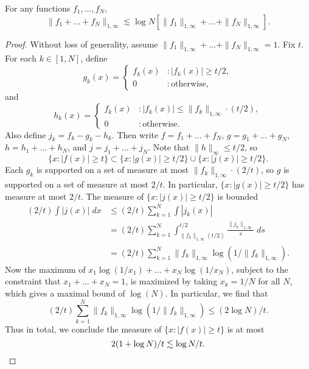 \begin{theorem}
    For any functions $f_1,\dots, f_N$,
    \[ \| f_1 + \dots + f_N \|_{1,\infty} \lesssim \log N \left[ \| f_1 \|_{1,\infty} + \dots + \| f_N \|_{1,\infty} \right]. \]
\end{theorem}
\begin{proof}
    Without loss of generality, assume $\| f_1 \|_{1,\infty} + \dots + \| f_N \|_{1,\infty} = 1$. Fix $t$. For each $k \in [1,N]$, define
    \[ g_k(x) = \begin{cases} f_k(x) &: |f_k(x)| \geq t/2, \\ 0 &: \text{otherwise}, \end{cases} \]
    and
    \[ h_k(x) = \begin{cases} f_k(x) &: |f_k(x)| \leq \| f_k \|_{1,\infty} \cdot (t/2), \\ 0 &: \text{otherwise}. \end{cases} \]
    Also define $j_k = f_k - g_k - h_k$. Then write $f = f_1 + \dots + f_N$, $g = g_1 + \dots + g_N$, $h = h_1 + \dots + h_N$, and $j = j_1 + \dots + j_N$. Note that $\| h \|_\infty \leq t/2$, so
    \[ \{ x : |f(x)| \geq t \} \subset \{ x : |g(x)| \geq t/2 \} \cup \{ x : |j(x)| \geq t/2 \}. \]
    Each $g_k$ is supported on a set of measure at most $\| f_k \|_{1,\infty} \cdot (2/t)$, so $g$ is supported on a set of measure at most $2/t$. In particular, $\{ x : |g(x)| \geq t/2 \}$ has measure at most $2/t$. The measure of $\{ x : |j(x)| \geq t/2 \}$ is bounded
    \begin{align*}
        (2/t) \int |j(x)|\; dx &\leq (2/t) \sum_{k = 1}^N \int |j_k(x)|\\
        &= (2/t) \sum_{k = 1}^N \int_{\| f_k \|_{1,\infty} (t/2)}^{t/2} \frac{\| j_k \|_{1,\infty}}{s}\; ds\\
        &= (2/t) \sum_{k = 1}^N \| f_k \|_{1,\infty} \log(1/\| f_k \|_{1,\infty}).
    \end{align*}
    Now the maximum of $x_1 \log(1/x_1) + \dots + x_N \log(1/x_N)$, subject to the constraint that $x_1 + \dots + x_N = 1$, is maximized by taking $x_k = 1/N$ for all $N$, which gives a maximal bound of $\log(N)$. In particular, we find that
    \[ (2/t) \sum_{k = 1}^N \| f_k \|_{1,\infty} \log(1/\| f_k \|_{1,\infty}) \leq (2 \log N)/t. \]
    Thus in total, we conclude the measure of $\{ x: |f(x)| \geq t \}$ is at most
    \[ 2(1 + \log N)/t \lesssim \log N / t. \qedhere \]
\end{proof}

